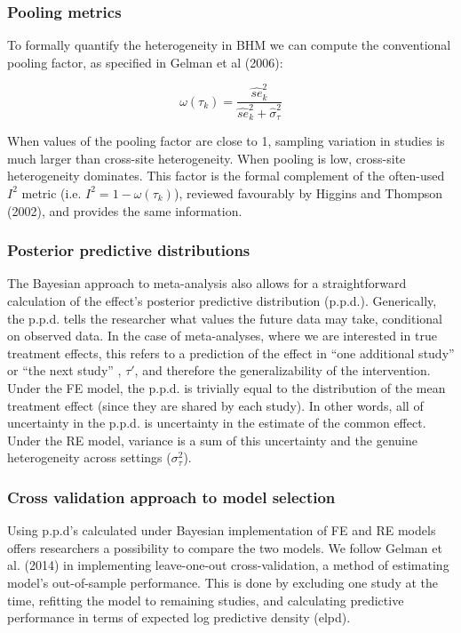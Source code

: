\documentclass[12pt]{article}
\begin{document}
\subsubsection*{Pooling metrics}

To formally quantify the heterogeneity in BHM we can compute the conventional pooling factor, as specified in Gelman et al (2006):

\begin{equation}
\omega(\tau_k) = \frac{\hat{se}^2_k }{\hat{se}^2_k + \hat{\sigma}_{\tau}^2 }
\end{equation}

When values of the pooling factor are close to 1, sampling variation in studies is much larger than cross-site heterogeneity. When pooling is low, cross-site heterogeneity dominates. This factor is the formal complement of the often-used $I^2$ metric (i.e. $I^2 = 1- \omega(\tau_k)$), reviewed favourably by Higgins and Thompson (2002), and provides the same information. 


\subsubsection*{Posterior predictive distributions}

The Bayesian approach to meta-analysis also allows for a straightforward calculation of the effect's posterior predictive distribution (p.p.d.). Generically, the p.p.d. tells the researcher what values the future data may take, conditional on observed data. In the case of meta-analyses, where we are interested in true treatment effects, this refers to a prediction of the effect in ``one additional study'' or ``the next study'' , $\tau'$, and therefore the generalizability of the intervention. Under the FE model, the p.p.d. is trivially equal to the distribution of the mean treatment effect (since they are shared by each study). In other words, all of uncertainty in the p.p.d. is uncertainty in the estimate of the common effect. Under the RE model, variance is a sum of this uncertainty and the genuine heterogeneity across settings ($\sigma_\tau^2$). 

\subsubsection*{Cross validation approach to model selection}

Using p.p.d's calculated under Bayesian implementation of FE and RE models offers researchers a possibility to compare the two models. We follow Gelman et al. (2014) in implementing leave-one-out cross-validation, a method of estimating model's out-of-sample performance. This is done by excluding one study at the time, refitting the model to remaining studies, and calculating predictive performance in terms of expected log predictive density (elpd).
\end{document}
